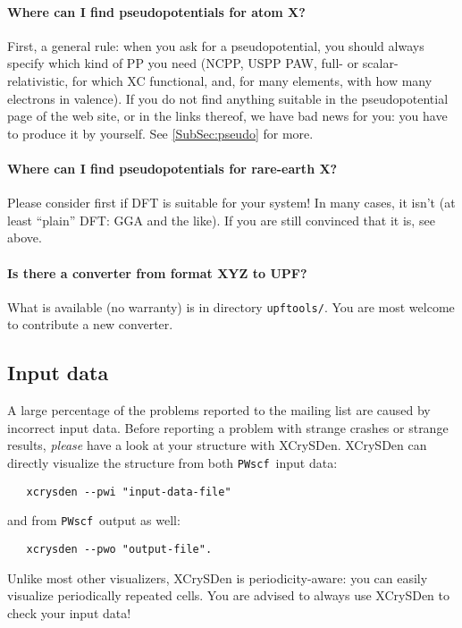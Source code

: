 \documentclass[12pt,a4paper]{article}
\def\PWscf{\texttt{PWscf}}
\begin{document}
\paragraph{Where can I find pseudopotentials for atom X?}

First, a general rule: when you ask for a pseudopotential, you should
always specify which kind of PP you need (NCPP, USPP
PAW, full- or scalar-relativistic, for which XC functional,
and, for many elements, with how many electrons in valence).
If you do not find anything suitable in the pseudopotential page 
of the web site, or in the links thereof, we have bad news for you: 
you have to produce it by yourself. 
See \ref{SubSec:pseudo} for more.

\paragraph{Where can I find pseudopotentials for rare-earth X?}

Please consider first if DFT is suitable for your system! In many cases, 
it isn't (at least ``plain'' DFT: GGA and the like). If you are still
convinced that it is, see above.

\paragraph{Is there a converter from format XYZ to UPF?}

What is available (no warranty) is in directory \texttt{upftools/}.
You are most welcome to contribute a new converter.


\subsection{Input data}

A large percentage of the problems reported to the mailing list are
caused by incorrect input data. Before reporting a problem with
strange crashes or strange results, {\em please} have
a look at your structure with XCrySDen. XCrySDen can directly
visualize the structure from both \PWscf\ input data:
\begin{verbatim}
   xcrysden --pwi "input-data-file"
\end{verbatim}
and from \PWscf\ output as well:
\begin{verbatim}
   xcrysden --pwo "output-file".
\end{verbatim}
Unlike most other visualizers, XCrySDen is periodicity-aware: you can
easily visualize periodically repeated cells.
You are advised to always use XCrySDen to check your input data! 
\end{document}
